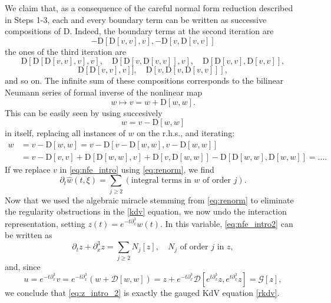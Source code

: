 \documentclass[%
11pt,  reqno]{amsart}
\newcommand{\5}{\textup{V}}
\newcommand{\dx}{\partial_x}
\newcommand{\dt}{\partial_t}
\newcommand{\jp}{\color{orange}}
\theoremstyle{remark}
\newcommand{\Gc}{\mathcal{G}}
\numberwithin{equation}{section}
\numberwithin{theorem}{section}
\newcommand{\D}{\mathrm{D}}
\newcommand{\DD}{\mathcal{D}}
\begin{document}
	We claim that, as a consequence of the careful normal form reduction described in Steps 1-3, each and every boundary term can be written as successive compositions of $\D$. Indeed, the boundary terms at the second iteration are
	$$
	-\D[\D[v,v],v], -\D[v,\D[v,v]]
	$$
	the ones of the third iteration are
	$$
	\D[\D[\D[v,v],v],v],\quad \D[\D[v,\D[v,v]],v],\quad \D[\D[v,v],\D[v,v]],$$
	$$\D[\D[v,v],v]],\quad \D[v,\D[v,\D[v,v]]],
	$$
	and so on. The infinite sum of these compositions corresponds to the bilinear Neumann series of formal inverse of the nonlinear map
\begin{equation}\label{eq:renorm}
		w\mapsto v=w+\D[w,w].
	\end{equation}
    This can be easily seen  by using succesively 
	$$
	w=v-\D[w,w]
	$$
	in itself, replacing all instances of $w$ on the r.h.s., and iterating:
	\begin{align}
		w&=v-\D[w,w]=v-\D[v-\D[w,w],v-\D[w,w]]\\&=v-\D[v,v]+\D[\D[w,w],v]+\D[v,\D[w,w]]-\D[\D[w,w],\D[w,w]]=\dots.
	\end{align}
	If we replace $v$ in \eqref{eq:nfe_intro} using \eqref{eq:renorm}, we find
	\begin{equation}\label{eq:nfe_intro2}
		\dt \widehat{w}(t,\xi)= \sum_{j\ge 2} (\mbox{integral terms in }w\mbox{ of order }j).
	\end{equation}
    Now that {\jp we used the algebraic miracle stemming from \eqref{eq:renorm} to} eliminate the regularity obstructions in the \eqref{kdv} equation, we now undo the interaction representation, setting $z(t)=e^{-t\partial_x^3}w(t)$. In this variable, \eqref{eq:nfe_intro2} can be written as
    \begin{equation}\label{eq:z_intro_2}
\dt z + \dx^3 z = \sum_{j\ge 2} N_j[z],\quad N_j\mbox{ of order }j \mbox{ in }z,
    \end{equation}
    and, since
    \begin{equation}
u=e^{-t\dx^3}v= e^{-t\dx^3}\left(w+\DD[w,w]\right)= z + e^{-t\dx^3}\DD[e^{t\dx^3}z, e^{t\dx^3}z] = \Gc[z],
    \end{equation}
	we conclude that \eqref{eq:z_intro_2} is exactly the gauged KdV equation \eqref{rkdv}.
	
	\medskip
	
	
	
\end{document}
